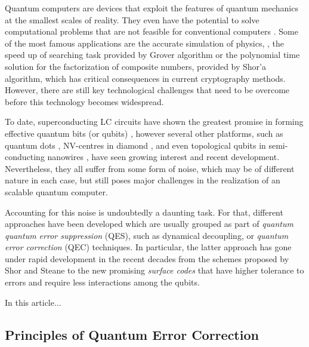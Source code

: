 
Quantum computers are devices that exploit the features of quantum mechanics at
the smallest scales of reality. They even have the potential to solve
computational problems that are not feasible for conventional computers
\cite{nielsen_chuang_2010}. Some of the most famous
applications are the accurate simulation of physics,
\cite{feynman82_simul_physic_with_comput}, the speed up of searching task
provided by Grover algorithm\cite{Grover_1996} or the polynomial time solution
for the factorization of composite numbers, provided by Shor'a
algorithm\cite{Shor_1997}, which has critical consequences in current cryptography
methods. However, there are still key technological challenges that need to be
overcome before this technology becomes widespread.

To date, superconducting LC circuits have shown the greatest promise in forming
effective quantum bits (or qubits) \cite{Rol_2019}
\cite{barends14_super_quant_circuit_at_surfac}, however several other platforms,
such as quantum dots \cite{huang19_fidel_bench_two_qubit_gates_silic}
\cite{Lawrie_2020}, NV-centres in diamond \cite{Taminiau_2014}, and even
topological qubits in semi-conducting nanowires \cite{Mourik_2012}, have seen
growing interest and recent development. Nevertheless, they all suffer from some
form of noise, which may be of different nature in each case, but still poses
major challenges in the realization of an scalable quantum computer.

Accounting for this noise is undoubtedly a daunting task. For that, different
approaches have been developed which are usually grouped as part of
\textit{quantum quantum error suppression} (QES), such as dynamical decoupling,
or \textit{quantum error correction} (QEC) techniques. In particular, the latter
approach has gone under rapid development in the recent decades from the schemes
proposed by Shor\cite{Shor_1995_QEC} and Steane \cite{Steane_1996_QEC} to the
new promising \textit{surface codes} \cite{fowler12_surfac_codes} that have
higher tolerance to errors and require less interactions among the qubits.

In this article...

\subsection{Principles of Quantum Error Correction}

